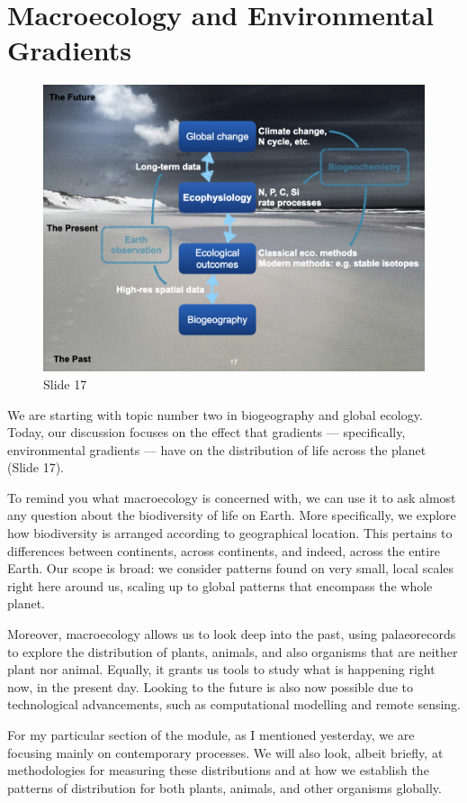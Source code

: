 \documentclass[
  11pt,
]{book}
\begin{document}
\section{Macroecology and Environmental
Gradients}\label{macroecology-and-environmental-gradients}

\begin{figure}[ht]
\centering
\includegraphics[width=0.8\linewidth]{../images/BDC334/BDC334-017.jpeg}
\caption*{Slide 17}
\end{figure}

We are starting with topic number two in biogeography and global
ecology. Today, our discussion focuses on the effect that gradients ---
specifically, environmental gradients --- have on the distribution of
life across the planet (Slide 17).

To remind you what macroecology is concerned with, we can use it to ask
almost any question about the biodiversity of life on Earth. More
specifically, we explore how biodiversity is arranged according to
geographical location. This pertains to differences between continents,
across continents, and indeed, across the entire Earth. Our scope is
broad: we consider patterns found on very small, local scales right here
around us, scaling up to global patterns that encompass the whole
planet.

Moreover, macroecology allows us to look deep into the past, using
palaeorecords to explore the distribution of plants, animals, and also
organisms that are neither plant nor animal. Equally, it grants us tools
to study what is happening right now, in the present day. Looking to the
future is also now possible due to technological advancements, such as
computational modelling and remote sensing.

For my particular section of the module, as I mentioned yesterday, we
are focusing mainly on contemporary processes. We will also look, albeit
briefly, at methodologies for measuring these distributions and at how
we establish the patterns of distribution for both plants, animals, and
other organisms globally.
\end{document}
